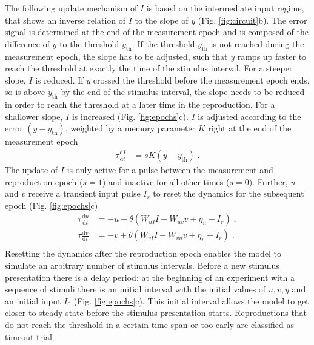 \documentclass[10pt]{article}
\begin{document}
\noindent
 The following update mechanism of $I$ is based on the intermediate input regime, that shows an inverse relation of $I$ to the slope of $y$ (Fig. \ref{fig:circuit}b).
The error signal is determined at the end of the measurement epoch and is composed of the difference of $y$ to the threshold $y_{\text{th}}$.
If the threshold $y_{\text{th}}$ is not reached during the measurement epoch, the slope has to be adjusted, such that $y$ ramps up faster to reach the threshold at exactly the time of the stimulus interval. For a steeper slope, $I$ is reduced.
If $y$ crossed the threshold before the measurement epoch ends, so is above $y_{\text{th}}$ by the end of the stimulus interval, the slope needs to be reduced in order to reach the threshold at a later time in the reproduction. For a shallower slope, $I$ is increased (Fig. \ref{fig:epochs}c).
$I$ is adjusted according to the error $(y-y_{\text{th}})$, weighted by a memory parameter $K$ right at the end of the measurement epoch
\begin{equation} \label{Iupdate}
	\begin{split}
	\tau\frac{\text{d}I}{\text{d}t} & = sK(y-y_{\text{th}}) \;.
	\end{split}
\end{equation}
The update of $I$ is only active for a pulse between the measurement and reproduction epoch ($s=1$) and inactive for all other times ($s=0$).
Further, $u$ and $v$ receive a transient input pulse $I_r$ to reset the dynamics for the subsequent epoch (Fig. \ref{fig:epochs}c)
\begin{equation} \label{experimentcircuit}
	\begin{split}
	\tau\frac{\text{d}u}{\text{d}t} & = -u + \theta(W_{uI}I - W_{uv}v + \eta_u - I_r) \;,\\
	\tau\frac{\text{d}v}{\text{d}t} & = -v + \theta(W_{vI}I - W_{vu}v + \eta_v + I_r) \;.\\
	\end{split}
\end{equation}
Resetting the dynamics after the reproduction epoch enables the model to simulate an arbitrary number of stimulus intervals. 
Before a new stimulus presentation there is a delay period: at the beginning of an experiment with a sequence of stimuli there is an initial interval with the initial values of $u, v, y$ and an initial input $I_0$ (Fig. \ref{fig:epochs}c). 
This initial interval allows the model to get closer to steady-state before the stimulus presentation starts. 
Reproductions that do not reach the threshold in a certain time span  or too early are classified as timeout trial.
\end{document}
